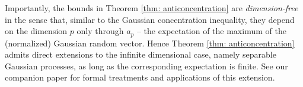 \documentclass[11pt,reqno]{amsart}
\theoremstyle{definition}
\newtheorem{remark}{Comment}
\newcommand{\LL}{ \mathcal{L}}
\newcommand{\RR}{\mathbb{R}}
\begin{document}
 Importantly, the bounds in Theorem \ref{thm: anticoncentration} are {\em dimension-free} in the sense that, similar to the Gaussian concentration inequality, they depend on the dimension $p$ only through $a_{p}$ -- the expectation of the maximum of the (normalized) Gaussian random vector. Hence Theorem \ref{thm: anticoncentration} admits direct extensions to the infinite dimensional case, namely separable Gaussian processes, as long as the corresponding expectation is finite. See our companion paper \cite{CCK13} for formal treatments and applications of this extension.



%
\end{document}
